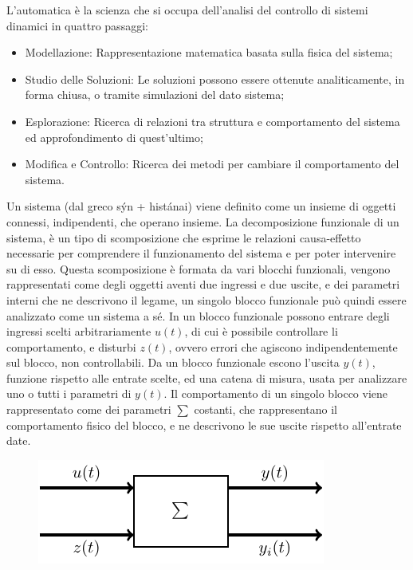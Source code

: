 \documentclass{article}
\numberwithin{equation}{subsection}
\begin{document}
L'automatica è la scienza che si occupa dell'analisi del controllo di sistemi dinamici in quattro passaggi:
\begin{itemize}
    \item Modellazione: Rappresentazione matematica basata sulla fisica del sistema;
    \item Studio delle Soluzioni: Le soluzioni possono essere ottenute analiticamente, in forma chiusa, o tramite simulazioni del dato sistema;
    \item Esplorazione: Ricerca di relazioni tra struttura e comportamento del sistema ed approfondimento di quest'ultimo;
    \item Modifica e Controllo: Ricerca dei metodi per cambiare il comportamento del sistema.
\end{itemize}
Un sistema (dal greco s\'{y}n + hist\'{a}nai) viene definito come un insieme di oggetti connessi, indipendenti, che operano insieme.
La decomposizione funzionale di un sistema, è un tipo di scomposizione che esprime le relazioni causa-effetto necessarie per comprendere il 
funzionamento del sistema e per poter intervenire su di esso. 
Questa scomposizione è formata da vari blocchi funzionali, vengono rappresentati come degli oggetti aventi due ingressi e due uscite, e dei parametri 
interni che ne descrivono il legame, un singolo blocco funzionale può quindi essere analizzato come un sistema a sé. In un blocco funzionale possono 
entrare degli ingressi scelti arbitrariamente $u(t)$, di cui è possibile 
controllare li comportamento, e disturbi $z(t)$, ovvero errori che agiscono indipendentemente sul blocco, non controllabili. Da un blocco funzionale 
escono l'uscita $y(t)$, funzione rispetto alle entrate scelte, ed una catena di misura, usata per analizzare uno o tutti i parametri di $y(t)$. 
Il comportamento di un singolo blocco viene rappresentato come dei parametri $\sum$ costanti, che rappresentano il comportamento fisico del blocco, 
e ne descrivono le sue uscite rispetto all'entrate date. 

\begin{figure}[H]%
    \centering
    \includegraphics{blocco-funzionale-1.pdf}%
\end{figure}
\end{document}
